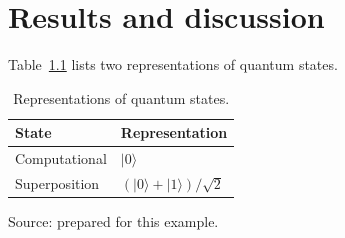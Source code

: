 \chapter{Results and discussion}
Table~\ref{tab:estados} lists two representations of quantum states.
\begin{table}[htbp]
\centering\caption{Representations of quantum states.}\label{tab:estados}
\begin{tabularx}{.84\textwidth}{@{}lX@{}}\toprule
State & Representation \\\midrule
Computational & $\lvert0\rangle$ \\
Superposition & $(\lvert0\rangle+\lvert1\rangle)/\sqrt{2}$ \\\bottomrule
\end{tabularx}
\par\medskip
\begin{minipage}{.84\textwidth}
\raggedright\footnotesize Source: prepared for this example.
\end{minipage}
\end{table}
